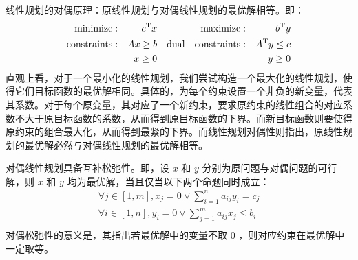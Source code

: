 线性规划的对偶原理：原线性规划与对偶线性规划的最优解相等。即：
$$
\begin{aligned}
    {\rm minimize}: & & c^{\rm T}x & & & & {\rm maximize}:& & b^{\rm T}y \\
    {\rm constraints}: & & Ax\ge b &  & {\rm dual} & & {\rm constraints}:& & A^{\rm T}y\le c\\
    & & x\ge 0 & & & & & & y\ge 0
\end{aligned}
$$
直观上看，对于一个最小化的线性规划，我们尝试构造一个最大化的线性规划，使得它们目标函数的最优解相同。具体的，为每个约束设置一个非负的新变量，代表其系数。对于每个原变量，其对应了一个新约束，要求原约束的线性组合的对应系数不大于原目标函数的系数，从而得到原目标函数的下界。而新目标函数则要使得原约束的组合最大化，从而得到最紧的下界。而线性规划对偶性则指出，原线性规划的最优解必然与对偶线性规划的最优解相等。

对偶线性规划具备互补松弛性。即，设 $x$ 和 $y$ 分别为原问题与对偶问题的可行解，则 $x$ 和 $y$ 均为最优解，当且仅当以下两个命题同时成立：
$$
    \begin{aligned}
        \forall j\in[1,m], x_j=0\lor\sum_{i=1}^n a_{ij}y_i=c_j\\
        \forall i\in[1,n], y_i=0\lor\sum_{j=1}^m a_{ij}x_j\le b_i\\
    \end{aligned}
$$
对偶松弛性的意义是，其指出若最优解中的变量不取 $0$ ，则对应约束在最优解中一定取等。